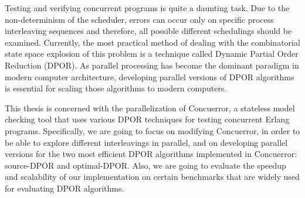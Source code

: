 Testing and verifying concurrent programs is quite a daunting task. Due to the non-determinism of the scheduler,
errors can occur only on specific process interleaving sequences and therefore, all possible different
schedulings should be examined. Currently, the most practical method of dealing with the combinatorial state space
explosion of this problem is a technique called Dynamic Partial Order Reduction (DPOR). As parallel processing
has become the dominant paradigm in modern computer architecture, developing parallel versions of DPOR algorithms is essential 
for scaling those algorithms to modern computers.

This thesis is concerned with the parallelization of Concuerror, a stateless model checking tool that uses various
DPOR techniques for testing concurrent Erlang programs. Specifically, we are going to focus on modifying Concuerror, 
in order to be able to explore different interleavings in parallel, and on developing parallel
versions for the two most efficient DPOR algorithms implemented in Concuerror: source-DPOR and optimal-DPOR.
Also, we are going to evaluate the speedup and scalability of our implementation on certain benchmarks that
are widely used for evaluating DPOR algorithms.